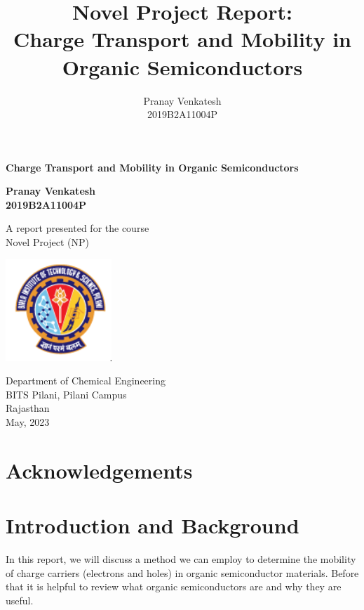 \documentclass{article}
\title{Novel Project Report: \\ Charge Transport and Mobility in Organic Semiconductors}
\author{Pranay Venkatesh \\ 2019B2A11004P}
\begin{document}
\begin{titlepage}
   \begin{center}
       \vspace*{1cm}

       \textbf{Charge Transport and Mobility in Organic Semiconductors}
            
       \vspace{1.5cm}

       \textbf{Pranay Venkatesh \\ 2019B2A11004P}

       \vspace{4cm}
            
       A report presented for the course\\
       Novel Project (NP)
            
       \vspace{0.8cm}
     
       \includegraphics[width=0.3\textwidth]{university}
            
       Department of Chemical Engineering\\
       BITS Pilani, Pilani Campus\\
       Rajasthan\\
       May, 2023
            
   \end{center}
\end{titlepage}


\tableofcontents

\pagebreak

\section*{Acknowledgements}

\section{Introduction and Background}

In this report, we will discuss a method we can employ to determine the mobility of charge carriers (electrons and holes) in organic semiconductor materials. Before that it is helpful to review what organic semiconductors are and why they are useful.
\end{document}
